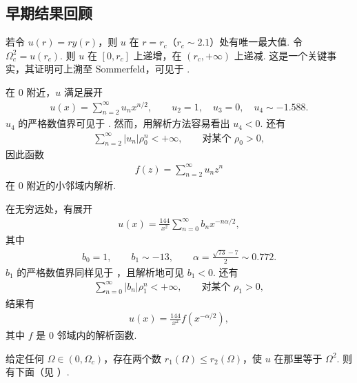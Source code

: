 \subsection{早期结果回顾}

若令 $u(r) = ry(r)$，则 $u$ 在 $r = r_c$（$r_c \sim 2.1$）处有唯一最大值. 令 $\Omega_c^2 = u(r_c)$. 则 $u$ 在 $[0, r_c]$ 上递增，在 $(r_c, +\infty)$ 上递减. 这是一个关键事实，其证明可上溯至 Sommerfeld，可见于 \cite{b218}.

在 $0$ 附近，$u$ 满足展开
\begin{align*}
  u(x)=\sum_{n=2}^{\infty}u_{n}x^{n/2},\qquad u_{2}=1,\quad u_{3}=0,\quad u_{4}\sim-1.588.
\end{align*}
$u_4$ 的严格数值界可见于 \cite{b208}. 然而，用解析方法容易看出 $u_4 < 0$. 还有
\begin{align*}
  \sum_{n=2}^{\infty}\left|u_{n}\right|\rho_{0}^{n}<+\infty,\qquad \text{对某个 } \rho_{0}>0,
\end{align*}
因此函数
\begin{align*}
  f(z)=\sum_{n=2}^{\infty}u_{n}z^{n}
\end{align*}
在 $0$ 附近的小邻域内解析.

在无穷远处，有展开
\begin{align*}
  u(x)=\frac{144}{x^{2}}\sum_{n=0}^{\infty}b_{n}x^{-n\alpha/2},
\end{align*}
其中
\begin{align*}
  b_{0}=1,\qquad b_{1}\sim-13,\qquad
  \alpha=\frac{\sqrt{73}-7}{2}\sim 0.772.
\end{align*}
$b_1$ 的严格数值界同样见于 \cite{b208}，且解析地可见 $b_1 < 0$. 还有
\begin{align*}
  \sum_{n=0}^{\infty}\left|b_{n}\right|\rho_{1}^{n}<+\infty,\qquad \text{对某个 } \rho_{1}>0,
\end{align*}
结果有
\begin{align*}
  u(x)=\frac{144}{x^{2}}f(x^{-\alpha/2}),
\end{align*}
其中 $f$ 是 $0$ 邻域内的解析函数.

给定任何 $\Omega \in (0, \Omega_c)$，存在两个数 $r_1(\Omega) \leq r_2(\Omega)$，使 $u$ 在那里等于 $\Omega^2$. 则有下面（见 \cite{b201}）.

